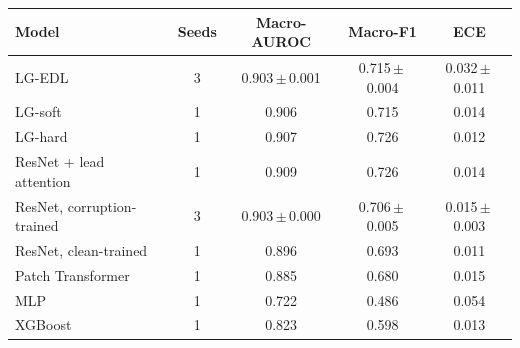 \begin{tabular}{@{}lcccc@{}}
\toprule
Model & Seeds & Macro-AUROC & Macro-F1 & ECE \\
\midrule
LG-EDL & 3 & 0.903\,$\pm$\,0.001 & 0.715\,$\pm$\,0.004 & 0.032\,$\pm$\,0.011 \\
LG-soft & 1 & 0.906 & 0.715 & 0.014 \\
LG-hard & 1 & 0.907 & 0.726 & 0.012 \\
ResNet + lead attention & 1 & 0.909 & 0.726 & 0.014 \\
ResNet, corruption-trained & 3 & 0.903\,$\pm$\,0.000 & 0.706\,$\pm$\,0.005 & 0.015\,$\pm$\,0.003 \\
ResNet, clean-trained & 1 & 0.896 & 0.693 & 0.011 \\
Patch Transformer & 1 & 0.885 & 0.680 & 0.015 \\
MLP & 1 & 0.722 & 0.486 & 0.054 \\
XGBoost & 1 & 0.823 & 0.598 & 0.013 \\
\bottomrule
\end{tabular}
